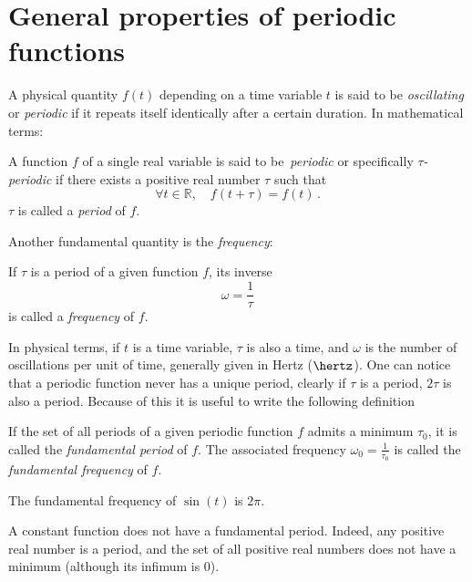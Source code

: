 \section{General properties of periodic functions}
A physical quantity $f(t)$ depending on a time variable $t$ is said to be
\emph{oscillating} or \emph{periodic} if it repeats itself identically after a certain
duration. In mathematical terms:
\begin{definition}
  A function $f$ of a single real variable is said to be~\emph{periodic} or specifically
  \emph{$\tau$-periodic} if there exists a positive real number $\tau$ such that
  \begin{equation}
    \forall t\in\mathbb{R},\quad f(t+\tau)=f(t)\,.
  \end{equation}
  $\tau$ is called a \emph{period} of $f$.
\end{definition}
Another fundamental quantity is the \emph{frequency}:
\begin{definition}
  If $\tau$ is a period of a given function $f$, its inverse
  \begin{equation}
    \omega=\frac{1}{\tau}
  \end{equation}
  is called a \emph{frequency} of $f$.
\end{definition}
In physical terms, if $t$ is a time variable, $\tau$ is also a time, and
$\omega$ is the number of oscillations per unit of time, generally given in Hertz
($\hertz$). One can notice that a periodic function never has a unique period, \eg clearly
if $\tau$ is a period, $2\tau$ is also a period. Because of this it is useful to write the
following definition
\begin{definition}
  If the set of all periods of a given periodic function $f$ admits a minimum $\tau_0$, it is
  called the \emph{fundamental period} of $f$. The associated frequency
  $\omega_0=\frac{1}{\tau_0}$ is called the \emph{fundamental frequency} of $f$.
\end{definition}
\begin{example}
  The fundamental frequency of $\sin(t)$ is $2\pi$.
\end{example}
\begin{example}
  A constant function does not have a fundamental period. Indeed, any positive real number
  is a period, and the set of all positive real numbers does not have a minimum (although its infimum is $0$).
\end{example}
